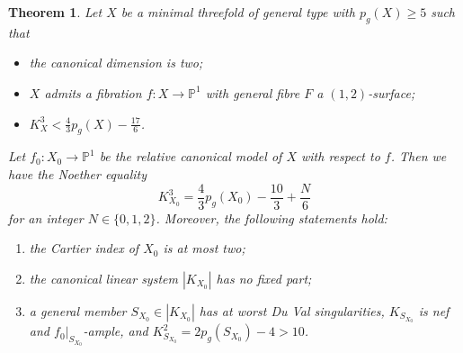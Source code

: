 \documentclass[a4paper,11pt]{amsart}
\newcommand{\PP}{\ensuremath{\mathbb{P}}}
\newtheorem{thm}{Theorem}[section]
\theoremstyle{definition}
\theoremstyle{remark}
\numberwithin{equation}{section}
\begin{document}
\begin{thm} \label{thm: Horikawa surface}
	Let $X$ be a minimal threefold of general type with $p_g(X) \ge 5$ such that 
	\begin{itemize}
		\item [(i)] the canonical dimension is two;
		\item [(ii)] $X$ admits a fibration $f: X \to \PP^1$ with general fibre $F$ a $(1, 2)$-surface;
		\item [(iii)] $K_X^3 < \frac{4}{3}p_g(X) - \frac{17}{6}$.
	\end{itemize}
	Let $f_0: X_0 \to \PP^1$ be the relative canonical model of $X$ with respect to $f$. Then we have the Noether equality
	$$
	K_{X_0}^3 = \frac{4}{3}p_g(X_0) - \frac{10}{3} + \frac{N}{6}
	$$
	for an integer $N \in \{0, 1, 2\}$. Moreover, the following statements hold:
	\begin{enumerate}
		\item[(1)] the Cartier index of $X_0$ is at most two;  
		\item[(2)] the canonical linear system $|K_{X_0}|$ has no fixed part;
		\item[(3)] a general member $S_{X_0} \in |K_{X_0}|$ has at worst Du Val singularities,  $K_{S_{X_0}}$ is nef and $f_0|_{S_{X_0}}$-ample, and $K_{S_{X_0}}^2 = 2p_g(S_{X_0}) - 4 > 10$.
	\end{enumerate} 
\end{thm}
\end{document}
